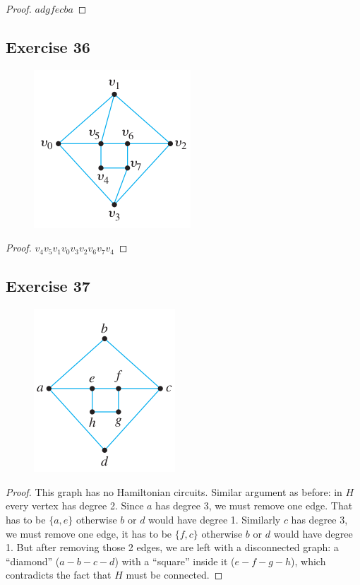\documentclass[14pt]{extarticle}
\begin{document}
\begin{proof}
\(adgfecba\)
\end{proof}

\subsection{Exercise 36}
\begin{figure}[ht!]
\centering
\includegraphics[scale=0.6]{../images/10.1.36.png}
\end{figure}

\begin{proof}
\(v_4v_5v_1v_0v_3v_2v_6v_7v_4\)
\end{proof}

\subsection{Exercise 37}
\begin{figure}[ht!]
\centering
\includegraphics[scale=0.6]{../images/10.1.37.png}
\end{figure}

\begin{proof}
This graph has no Hamiltonian circuits. Similar argument as before: in \(H\) every vertex has degree 2. Since \(a\) has
degree 3, we must remove one edge. That has to be \(\{a,e\}\) otherwise \(b\) or \(d\) would have degree 1. Similarly \(c\)
has degree 3, we must remove one edge, it has to be \(\{f,c\}\) otherwise \(b\) or \(d\) would have degree 1. But after
removing those 2 edges, we are left with a disconnected graph: a ``diamond'' (\(a-b-c-d\)) with a ``square'' inside it 
(\(e-f-g-h\)), which contradicts the fact that \(H\) must be connected.
\end{proof}
\end{document}
